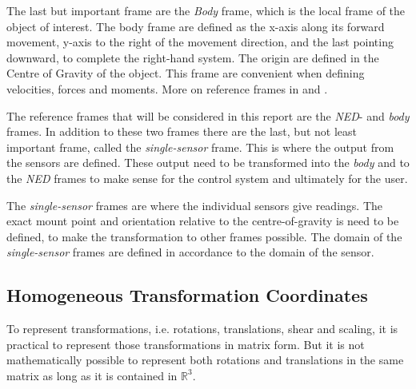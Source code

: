 	The last but important frame are the \emph{Body} frame, which is the local frame of the object of interest.
	The body frame are defined as the x-axis along its forward movement, y-axis to the right of the
	movement direction, and the last pointing downward, to complete the right-hand system. The
	origin are defined in the Centre of Gravity of the object. This frame are convenient when
	defining velocities, forces and moments. More on reference frames in \cite{fossen} and
    \cite{forsell}.

    The reference frames that will be considered in this report are the \emph{NED}- and
    \emph{body} frames. In addition to these two frames there are the last, but not least
    important frame, called the \emph{single-sensor} frame. This is where the output from
    the sensors are defined. These output need to be transformed into the \emph{body} and
    to the \emph{NED} frames to make sense for the control system and ultimately for the
    user. 

    The \emph{single-sensor} frames are where the individual sensors give readings. The
    exact mount point and orientation relative to the centre-of-gravity is need to be defined, to make the
    transformation to other frames possible. The domain of the \emph{single-sensor} frames
    are defined in accordance to the domain of the sensor.


\subsection{Homogeneous Transformation Coordinates}
To represent transformations, i.e. rotations, translations, shear and scaling, it is
practical to represent those transformations in matrix form. But it is not mathematically
possible to represent both rotations and translations in the same matrix as long as it is
contained in $\mathbb{R}^3$. 

